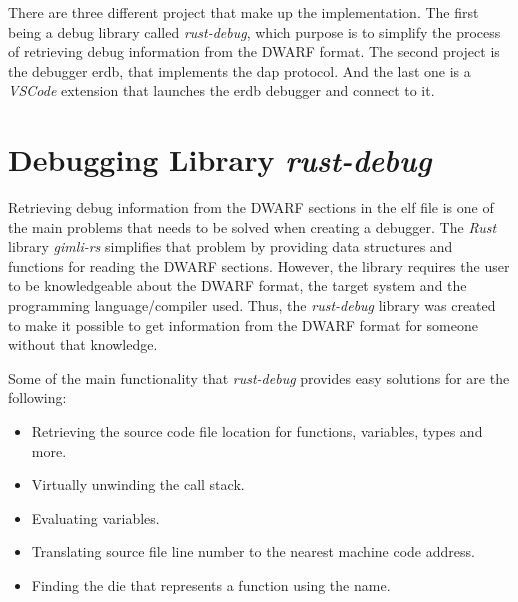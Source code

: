  

There are three different project that make up the implementation.
The first being a debug library called \emph{rust-debug}, which purpose is to simplify the process of retrieving debug information from the \gls{DWARF} format.
The second project is the debugger \gls{erdb}, that implements the \gls{dap} protocol.
And the last one is a \emph{VSCode} extension that launches the \gls{erdb} debugger and connect to it.


\section{Debugging Library \emph{rust-debug}}
\label{section:rust-debug}

Retrieving debug information from the \gls{DWARF} sections in the \gls{elf} file is one of the main problems that needs to be solved when creating a debugger.
The \emph{Rust} library \emph{gimli-rs} simplifies that problem by providing data structures and functions for reading the \gls{DWARF} sections.
However, the library requires the user to be knowledgeable about the \gls{DWARF} format, the target system and the programming language/compiler used.
Thus, the \emph{rust-debug} library was created to make it possible to get information from the \gls{DWARF} format for someone without that knowledge.

Some of the main functionality that \emph{rust-debug} provides easy solutions for are the following:

\begin{itemize}
  \item Retrieving the source code file location for functions, variables, types and more.
  \item Virtually unwinding the call stack.
  \item Evaluating variables.
  \item Translating source file line number to the nearest machine code address.
  \item Finding the \gls{die} that represents a function using the name.
\end{itemize}

